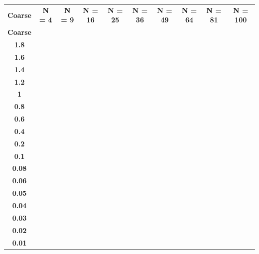 \noindent\begin{minipage}{\textwidth}
\centering
\begin{tabular}{c c c c c c c c c c }
\textbf{Coarse} &  \textbf{N = 4}	& \textbf{N = 9}	& \textbf{N = 16}	& \textbf{N = 25}	&\textbf{N = 36}&	\textbf{N = 49}	& \textbf{N = 64	}& \textbf{N = 81}	& \textbf{N = 100}  \\
\textbf{Coarse} & 		&		& 	        & 		&          &                   &               &             &                \\
\textbf{1.8	} & 				& 			&         &         &      &          &         &         &          \\
\textbf{1.6	} & 				& 			&         &         &      &          &         &         &          \\
\textbf{1.4	} & 				& 			&         &         &      &          &         &         &          \\
\textbf{1.2	} & 				& 			&         &         &      &          &         &         &          \\
\textbf{1}    & 				& 		  &         &         &      &          &         &         &          \\
\textbf{0.8	} & 				& 			&         &         &      &          &         &         &          \\
\textbf{0.6	} & 				& 			&         &         &      &          &         &         &          \\
\textbf{0.4	} & 				& 			&         &         &      &          &         &         &          \\
\textbf{0.2	} & 				& 			&         &         &      &          &         &         &          \\
\textbf{0.1	} & 				& 			&         &         &      &          &         &         &          \\
\textbf{0.08} & 				& 			& 	      &         &      &          &         &         &          \\
\textbf{0.06} & 				& 			& 	      &         &      &          &         &         &          \\
\textbf{0.05} & 				& 			& 	      &         &      &          &         &         &          \\
\textbf{0.04} & 				& 			& 	      &         &      &          &         &         &          \\
\textbf{0.03} & 				& 			& 	      &         &      &          &         &         &          \\
\textbf{0.02} & 				& 			& 	      &         &      &          &         &         &          \\
\textbf{0.01} & 				& 			& 	      &         &      &          &         &         &          \\
\end{tabular}
\label{study}
\end{minipage}
\smallskip

